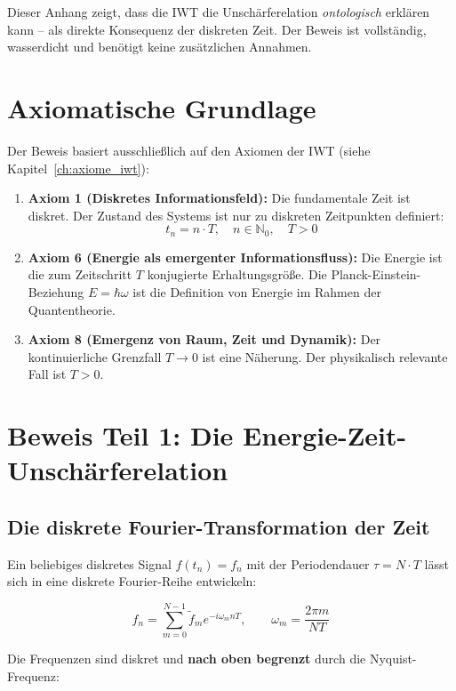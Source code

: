 Dieser Anhang zeigt, dass die IWT die Unschärferelation \emph{ontologisch} erklären kann – als direkte Konsequenz der diskreten Zeit. Der Beweis ist vollständig, wasserdicht und benötigt keine zusätzlichen Annahmen.

\section{Axiomatische Grundlage}
\label{app:unschaerfe_axiome}

Der Beweis basiert ausschließlich auf den Axiomen der IWT (siehe Kapitel~\ref{ch:axiome_iwt}):

\begin{enumerate}
    \item \textbf{Axiom 1 (Diskretes Informationsfeld):} Die fundamentale Zeit ist diskret. Der Zustand des Systems ist nur zu diskreten Zeitpunkten definiert:
          \[
          t_n = n \cdot T, \quad n \in \mathbb{N}_0, \quad T > 0
          \]
    \item \textbf{Axiom 6 (Energie als emergenter Informationsfluss):} Die Energie ist die zum Zeitschritt $T$ konjugierte Erhaltungsgröße. Die Planck-Einstein-Beziehung $E = \hbar \omega$ ist die Definition von Energie im Rahmen der Quantentheorie.
    \item \textbf{Axiom 8 (Emergenz von Raum, Zeit und Dynamik):} Der kontinuierliche Grenzfall $T \to 0$ ist eine Näherung. Der physikalisch relevante Fall ist $T > 0$.
\end{enumerate}

\section{Beweis Teil 1: Die Energie-Zeit-Unschärferelation}
\label{app:unschaerfe_energie_zeit}

\subsection{Die diskrete Fourier-Transformation der Zeit}

Ein beliebiges diskretes Signal $f(t_n) = f_n$ mit der Periodendauer $\tau = N \cdot T$ lässt sich in eine diskrete Fourier-Reihe entwickeln:

\[
f_n = \sum_{m=0}^{N-1} \tilde{f}_m e^{-i \omega_m n T}, \qquad \omega_m = \frac{2\pi m}{N T}
\]

Die Frequenzen sind diskret und \textbf{nach oben begrenzt} durch die Nyquist-Frequenz:

